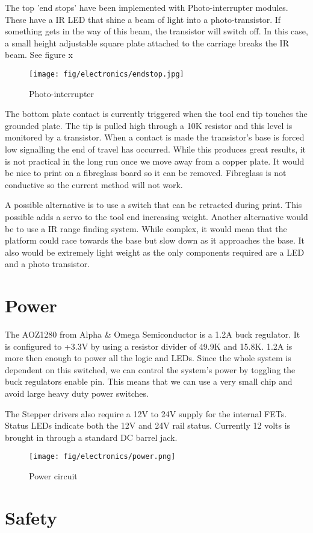 \documentclass[a4paper, 11pt, twoside]{Thesis}  %
\begin{document}
The top 'end stops' have been implemented with Photo-interrupter modules. These have a IR LED that shine a beam of light into a photo-transistor. If something gets in the way of this beam, the transistor will switch off. In this case, a small height adjustable square plate attached to the carriage breaks the IR beam. See figure x

\begin{figure}[H]
\centering%
\texttt{[image: fig/electronics/endstop.jpg]}
\caption{Photo-interrupter}
\label{fig:endstop.jpg}
\end{figure}

The bottom plate contact is currently triggered when the tool end tip touches the grounded plate. The tip is pulled high through a 10K resistor and this level is monitored by a transistor. When a contact is made the transistor's base is forced low signalling the end of travel has occurred. While this produces great results, it is not practical in the long run once we move away from a copper plate. It would be nice to print on a fibreglass board so it can be removed. Fibreglass is not conductive so the current method will not work.

A possible alternative is to use a switch that can be retracted during print. This possible adds a servo to the tool end increasing weight. Another alternative would be to use a IR range finding system. While complex, it would mean that the platform could race towards the base but slow down as it approaches the base. It also would be extremely light weight as the only components required are a LED and a photo transistor.
\section{Power}

The AOZ1280 from  Alpha \& Omega Semiconductor is a 1.2A buck regulator. It is configured to +3.3V by using a resistor divider of 49.9K and 15.8K. 1.2A is more then enough to power all the logic and LEDs. Since the whole system is dependent on this switched, we can control the system's power by toggling the buck regulators enable pin. This means that we can use a very small chip and avoid large heavy duty power switches.

The Stepper drivers also require a 12V to 24V supply for the internal FETs. Status LEDs indicate both the 12V and 24V rail status. Currently 12 volts is brought in through a standard DC barrel jack.

\begin{figure}[H]
\centering%
\texttt{[image: fig/electronics/power.png]}
\caption{Power circuit}
\label{fig:power.png}
\end{figure}\section{Safety}
\end{document}
